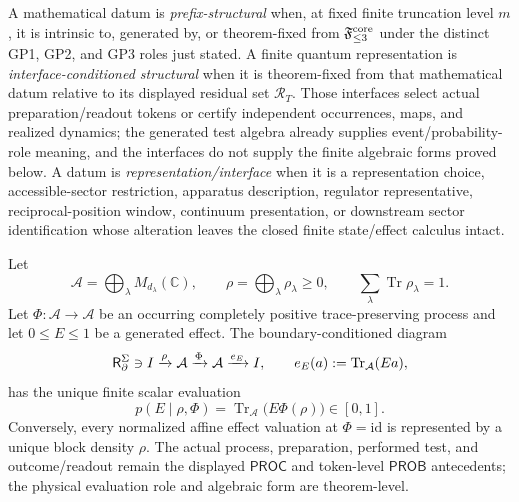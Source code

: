 \documentclass[12pt,a4paper]{article}
\begin{document}
\begin{definition}
\label{p4:def:structural-criterion}
A mathematical datum is \emph{prefix-structural} when, at fixed finite
truncation level \(m\), it is intrinsic to, generated by, or theorem-fixed
from \(\mathfrak F_{\le3}^{\rm core}\) under the distinct GP1, GP2, and GP3
roles just stated.  A finite quantum representation is
\emph{interface-conditioned structural} when it is theorem-fixed from that
mathematical datum relative to its displayed residual set \(\mathcal R_T\).
Those interfaces select actual preparation/readout tokens or certify
independent occurrences, maps, and realized dynamics; the generated test
algebra already supplies event/probability-role meaning, and the interfaces do
not supply the finite algebraic forms proved below.  A datum is
\emph{representation/interface} when it is a
representation choice, accessible-sector restriction, apparatus description,
regulator representative, reciprocal-position window, continuum
presentation, or downstream sector identification whose alteration leaves
the closed finite state/effect calculus intact.
\end{definition}

\begin{theorem}
\label{p4:thm:boundary-conditioned-readout-specialization}
Let
\[
 \mathcal A=\bigoplus_\lambda M_{d_\lambda}(\mathbb C),
 \qquad
 \rho=\bigoplus_\lambda\rho_\lambda\ge0,
 \qquad
 \sum_\lambda\operatorname{Tr}\rho_\lambda=1.
\]
Let \(\Phi:\mathcal A\to\mathcal A\) be an occurring completely positive
trace-preserving process and let \(0\le E\le1\) be a generated effect.  The
boundary-conditioned diagram
\[
 \mathsf R_{\partial}^{\Sigma}\ni
 I\xrightarrow{\rho}\mathcal A
 \xrightarrow{\Phi}\mathcal A
 \xrightarrow{e_E}I,
 \qquad e_E(a):=\operatorname{Tr}_{\mathcal A}(Ea),
\]
has the unique finite scalar evaluation
\[
 \boxed{p(E\mid\rho,\Phi)
 =\operatorname{Tr}_{\mathcal A}\!\bigl(E\Phi(\rho)\bigr)\in[0,1].}
\]
Conversely, every normalized affine effect valuation at \(\Phi=\mathrm{id}\)
is represented by a unique block density \(\rho\).  The actual process,
preparation, performed test, and outcome/readout remain the displayed
\(\mathsf{PROC}\) and token-level \(\mathsf{PROB}\) antecedents; the physical
evaluation role and algebraic form are theorem-level.
\end{theorem}
\end{document}
